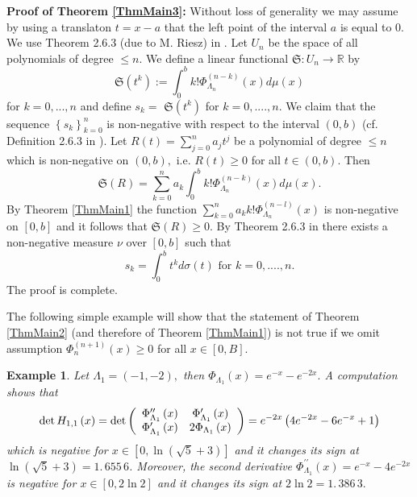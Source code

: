 \documentclass[11pt]{article}%
\newtheorem{example}[theorem]{Example}
\begin{document}
\textbf{Proof of Theorem \ref{ThmMain3}:} Without loss of generality we may
assume by using a translaton $t=x-a$ that the left point of the interval $a$
is equal to $0.$ We use Theorem 2.6.3 (due to M. Riesz) in \cite{Akhi65}. Let
$U_{n}$ be the space of all polynomials of degree $\leq n$. We define a linear
functional $\mathfrak{S}:U_{n}\rightarrow\mathbb{R}$ by
\[
\mathfrak{S}\left(  t^{k}\right)  :=\int_{0}^{b}k!\Phi_{\Lambda_{n}}^{\left(
n-k\right)  }\left(  x\right)  d\mu\left(  x\right)
\]
for $k=0,...,n$ and define $s_{k}=$ $\mathfrak{S}\left(  t^{k}\right)  $ for
$k=0,....,n$. We claim that the sequence $\left\{  s_{k}\right\}  _{k=0}^{n}$
is non-negative with respect to the interval $\left(  0,b\right)  $ (cf.
Definition 2.6.3 in \cite{Akhi65}). Let $R\left(  t\right)  =%
{\displaystyle\sum_{j=0}^{n}}
a_{j}t^{j}$ be a polynomial of degree $\leq n$ which is non-negative on
$\left(  0,b\right)  ,$ i.e. $R\left(  t\right)  \geq0$ for all $t\in\left(
0,b\right)  .$ Then%
\[
\mathfrak{S}\left(  R\right)  =%
{\displaystyle\sum_{k=0}^{n}}
a_{k}\int_{0}^{b}k!\Phi_{\Lambda_{n}}^{\left(  n-k\right)  }\left(  x\right)
d\mu\left(  x\right)  .
\]
By Theorem \ref{ThmMain1} the function $%
{\displaystyle\sum_{k=0}^{n}}
a_{k}k!\Phi_{\Lambda_{n}}^{\left(  n-l\right)  }\left(  x\right)  $ is
non-negative on $\left[  0,b\right]  $ and it follows that $\mathfrak{S}%
\left(  R\right)  \geq0.$ By Theorem 2.6.3 in \cite{Akhi65} there exists a
non-negative measure $\nu$ over $\left[  0,b\right]  $ such that
\[
s_{k}=\int_{0}^{b}t^{k}d\sigma\left(  t\right)  \text{ for }k=0,....,n.
\]
The proof is complete.

The following simple example will show that the statement of Theorem
\ref{ThmMain2} (and therefore of Theorem \ref{ThmMain1}) is not true if we
omit assumption $\Phi_{n}^{\left(  n+1\right)  }\left(  x\right)  \geq0$ for
all $x\in\left[  0,B\right]  .$

\begin{example}
\label{Example0}Let $\Lambda_{1}=\left(  -1,-2\right)  ,$ then $\Phi
_{\Lambda_{1}}\left(  x\right)  =e^{-x}-e^{-2x}.$ A computation shows that
\[
\det H_{1,1}\left(  x\right)  =\det\left(
\begin{array}
[c]{cc}%
\Phi_{\Lambda_{1}}^{\prime\prime}\left(  x\right)  & \Phi_{\Lambda_{1}%
}^{\prime}\left(  x\right) \\
\Phi_{\Lambda_{1}}^{\prime}\left(  x\right)  & 2\Phi_{\Lambda_{1}}\left(
x\right)
\end{array}
\right)  =e^{-2x}\left(  4e^{-2x}-6e^{-x}+1\right)
\]
which is negative for $x\in\left[  0,\ln\left(  \sqrt{5}+3\right)  \right]  $
and it changes its sign at $\ln\left(  \sqrt{5}+3\right)  =1.\,\allowbreak
655\,6$. Moreover, the second derivative $\Phi_{\Lambda_{1}}^{\prime\prime
}\left(  x\right)  =e^{-x}-4e^{-2x}$ is negative for $x\in\left[
0,2\ln2\right]  $ and it changes its sign at $2\ln2=\allowbreak1.\,\allowbreak
386\,3.$
\end{example}
\end{document}

